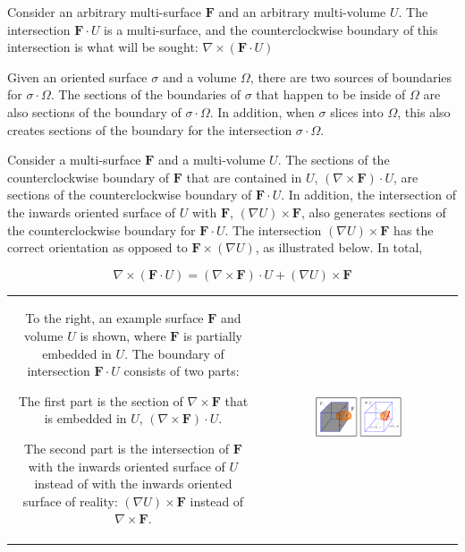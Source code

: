 Consider an arbitrary multi-surface \(\mathbf{F}\) and an arbitrary multi-volume \(U\). The intersection \(\mathbf{F} \cdot U\) is a multi-surface, and the counterclockwise boundary of this intersection is what will be sought: \(\nabla \times (\mathbf{F} \cdot U)\) 

Given an oriented surface \(\sigma\) and a volume \(\Omega\), there are two sources of boundaries for \(\sigma \cdot \Omega\). The sections of the boundaries of \(\sigma\) that happen to be inside of \(\Omega\) are also sections of the boundary of \(\sigma \cdot \Omega\). In addition, when \(\sigma\) slices into \(\Omega\), this also creates sections of the boundary for the intersection \(\sigma \cdot \Omega\).   

Consider a multi-surface \(\mathbf{F}\) and a multi-volume \(U\). The sections of the counterclockwise boundary of \(\mathbf{F}\) that are contained in \(U\), \((\nabla \times \mathbf{F}) \cdot U\), are sections of the counterclockwise boundary of \(\mathbf{F} \cdot U\). In addition, the intersection of the inwards oriented surface of \(U\) with \(\mathbf{F}\), \((\nabla U) \times \mathbf{F}\), also generates sections of the counterclockwise boundary for \(\mathbf{F} \cdot U\). The intersection \((\nabla U) \times \mathbf{F}\) has the correct orientation as opposed to \(\mathbf{F} \times (\nabla U)\), as illustrated below. In total,  

\begin{thm}
\[\nabla \times (\mathbf{F} \cdot U) = (\nabla \times \mathbf{F}) \cdot U + (\nabla U) \times \mathbf{F}\]
\end{thm}

\begin{tabular}{cc}
\parbox{0.5\textwidth}{
To the right, an example surface \(\mathbf{F}\) and volume \(U\) is shown, where \(\mathbf{F}\) is partially embedded in \(U\). The boundary of intersection \(\mathbf{F} \cdot U\) consists of two parts: 

The first part is the section of \(\nabla \times \mathbf{F}\) that is embedded in \(U\), \((\nabla \times \mathbf{F}) \cdot U\). 

The second part is the intersection of \(\mathbf{F}\) with the inwards oriented surface of \(U\) instead of with the inwards oriented surface of reality: \((\nabla U) \times \mathbf{F}\) instead of \(\nabla \times \mathbf{F}\).  
} & \parbox{0.5\textwidth}{
\includegraphics[width = 0.5\textwidth]{Boundaries/Surface_boundaries/surface_volume_intersection_boundary}
}
\end{tabular}

